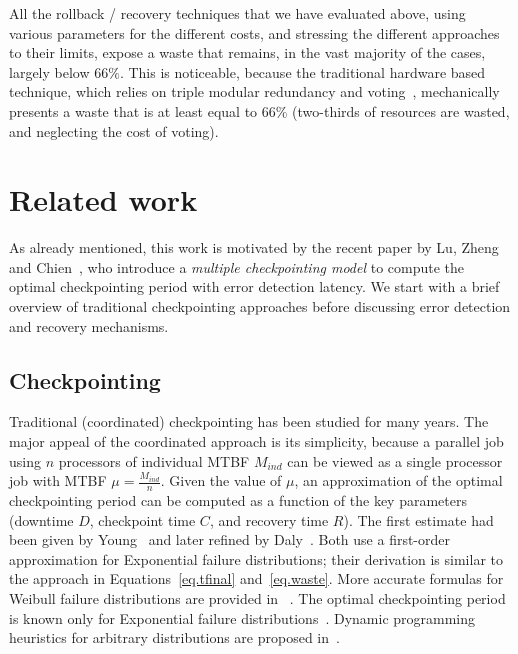 \documentclass[10pt,table]{article}
\newcommand{\ema}[1]{\ensuremath{#1}\xspace}
\newcommand{\ccc}{\ema{C}}
\newcommand{\rrr}{\ema{R}}
\newcommand{\ddd}{\ema{D}}
\newcommand{\muplatform}{\mu}
\begin{document}
All the rollback / recovery techniques that we
have evaluated above, using various parameters for the different
costs, and stressing the different approaches to their limits,
expose a waste that remains, in the vast majority of the cases,
largely below $66\%$. This is noticeable, because the traditional
hardware based technique, which relies on triple modular redundancy
and voting~\cite{Lyons1962}, mechanically presents  a waste that is at least
equal to $66\%$ (two-thirds of resources are wasted, and neglecting the cost of voting).

\section{Related work}
\label{sec.related}

As already mentioned, this work is motivated by the recent paper by 
Lu, Zheng and Chien~\cite{LuZhengChien2013}, who introduce a \emph{multiple checkpointing model} 
to compute the optimal checkpointing period with error detection latency. 
We start with a brief overview of traditional checkpointing approaches
before discussing error detection and recovery mechanisms. 

\subsection{Checkpointing}

Traditional (coordinated) checkpointing has been studied for many
years.  The major appeal of the coordinated approach is its
simplicity, because a parallel job using $n$ processors of individual
MTBF $M_{ind}$ can be viewed as a single processor job with MTBF
$\muplatform = \frac{M_{ind}}{n}$. Given the value of $\muplatform$, an approximation of
the optimal checkpointing period can be computed as a function of the
key parameters (downtime $\ddd$, checkpoint time $\ccc$,
and recovery time $\rrr$). The first estimate had been given by
Young~\cite{young74} and later refined by Daly~\cite{daly04}. Both
use a first-order approximation for Exponential failure
distributions; their derivation is similar to the approach in
Equations~\eqref{eq.tfinal} and~\eqref{eq.waste}.  More accurate
formulas for Weibull failure distributions are provided in
~\cite{ling2001variational,ozaki2006distribution,doi:10.1007/978-3-642-14390-8_22}.
The optimal checkpointing period is known only for Exponential failure
distributions~\cite{c178}.  Dynamic programming heuristics for
arbitrary distributions are proposed
in~\cite{toueg1983optimum,10.1109/TC.2012.57,c178}.
\end{document}
